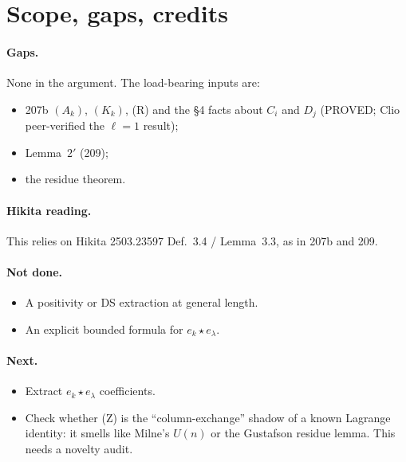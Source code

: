 \documentclass[11pt]{amsart}
\theoremstyle{remark}
\begin{document}
\section{Scope, gaps, credits}\label{sec:scope}

\paragraph{Gaps.} None in the argument. The load-bearing inputs are:
\begin{itemize}
\item 207b $(A_k)$, $(K_k)$, (R) and the \S4 facts about $C_i$ and $D_j$ (PROVED; Clio peer-verified the $\ell=1$ result);
\item Lemma~$2'$ (209);
\item the residue theorem.
\end{itemize}

\paragraph{Hikita reading.} This relies on Hikita 2503.23597 Def.~3.4 / Lemma~3.3, as in 207b and 209.

\paragraph{Not done.}
\begin{itemize}
\item A positivity or DS extraction at general length.
\item An explicit bounded formula for $e_k\star e_\lambda$.
\end{itemize}

\paragraph{Next.}
\begin{itemize}
\item Extract $e_k\star e_\lambda$ coefficients.
\item Check whether (Z) is the ``column-exchange'' shadow of a known Lagrange identity: it smells like Milne's $U(n)$ or the Gustafson residue lemma. This needs a novelty audit.
\end{itemize}
\end{document}
